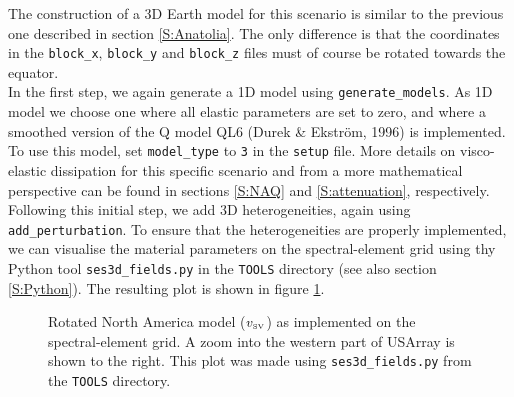 The construction of a 3D Earth model for this scenario is similar to the previous one described in section \ref{S:Anatolia}. The only difference is that the coordinates in the \texttt{block\_x}, \texttt{block\_y} and \texttt{block\_z} files must of course be rotated towards the equator.\\[5pt]
In the first step, we again generate a 1D model using \texttt{generate\_models}. As 1D model we choose one where all elastic parameters are set to zero, and where a smoothed version of the Q model QL6 (Durek \& Ekstr\"{o}m, 1996) is implemented. To use this model, set \texttt{model\_type} to \texttt{3} in the \texttt{setup} file. More details on visco-elastic dissipation for this specific scenario and from a more mathematical perspective can be found in sections \ref{S:NAQ} and \ref{S:attenuation}, respectively.\\[5pt] 
Following this initial step, we add 3D heterogeneities, again using \texttt{add\_perturbation}. To ensure that the heterogeneities are properly implemented, we can visualise the material parameters on the spectral-element grid using thy Python tool \texttt{ses3d\_fields.py} in the \texttt{TOOLS} directory (see also section \ref{S:Python}). The resulting plot is shown in figure \ref{F:fields}.  
\begin{center}
\begin{figure}
\center{} 
\caption{Rotated North America model ($v_\text{\tiny{SV}}$) as implemented on the spectral-element grid. A zoom into the western part of USArray is shown to the right. This plot was made using \texttt{ses3d\_fields.py} from the \texttt{TOOLS} directory.}\label{F:fields}
\end{figure}
\end{center}


